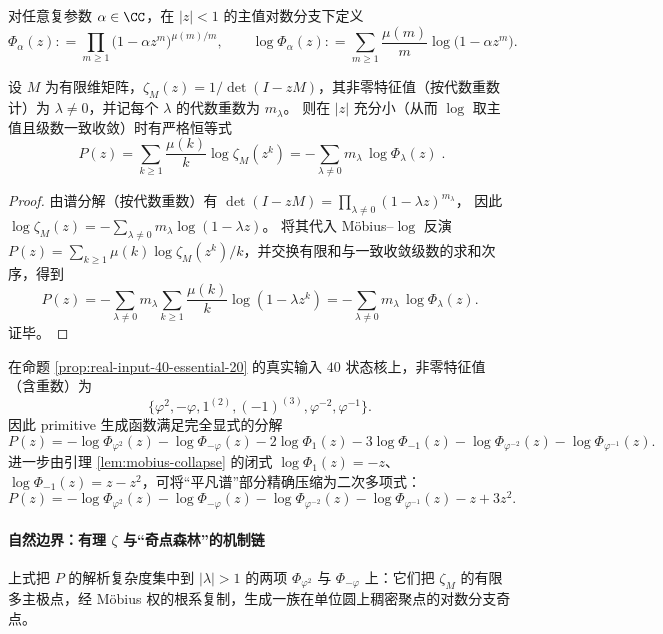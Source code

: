 \begin{definition}\label{def:mu-pochhammer}
对任意复参数 \(\alpha\in\CC\)，在 \(|z|<1\) 的主值对数分支下定义
\[
\Phi_\alpha(z)
:\!=\prod_{m\ge 1}\bigl(1-\alpha z^m\bigr)^{\mu(m)/m},
\qquad
\log\Phi_\alpha(z)
:\!=\sum_{m\ge 1}\frac{\mu(m)}{m}\log\bigl(1-\alpha z^m\bigr).
\]
\end{definition}

\begin{proposition}\label{prop:mu-pochhammer-decomposition}
设 \(M\) 为有限维矩阵，\(\zeta_M(z)=1/\det(I-zM)\)，其非零特征值（按代数重数计）为 \(\lambda\neq 0\)，并记每个 \(\lambda\) 的代数重数为 \(m_\lambda\)。
则在 \(|z|\) 充分小（从而 \(\log\) 取主值且级数一致收敛）时有严格恒等式
\[
\boxed{\;
P(z)
=\sum_{k\ge 1}\frac{\mu(k)}{k}\log\zeta_M(z^k)
=-\sum_{\lambda\neq 0}m_\lambda\,\log\Phi_\lambda(z)\; }.
\]
\end{proposition}
\begin{proof}
由谱分解（按代数重数）有
\(
\det(I-zM)=\prod_{\lambda\neq 0}(1-\lambda z)^{m_\lambda}
\)，
因此
\(
\log\zeta_M(z)
=-\sum_{\lambda\neq 0}m_\lambda\log(1-\lambda z)
\)。
将其代入 Möbius--$\log$ 反演
\(
P(z)=\sum_{k\ge 1}\mu(k)\log\zeta_M(z^k)/k
\)，并交换有限和与一致收敛级数的求和次序，得到
\[
P(z)
=-\sum_{\lambda\neq 0}m_\lambda\sum_{k\ge 1}\frac{\mu(k)}{k}\log(1-\lambda z^k)
=-\sum_{\lambda\neq 0}m_\lambda\,\log\Phi_\lambda(z).
\]
证毕。
\end{proof}

\begin{corollary}\label{cor:real-input-40-mu-pochhammer-explicit}
在命题 \ref{prop:real-input-40-essential-20} 的真实输入 \(40\) 状态核上，非零特征值（含重数）为
\[
\{\varphi^2,-\varphi,1^{(2)},(-1)^{(3)},\varphi^{-2},\varphi^{-1}\}.
\]
因此 primitive 生成函数满足完全显式的分解
\[
\boxed{
P(z)=
-\log\Phi_{\varphi^2}(z)
-\log\Phi_{-\varphi}(z)
-2\log\Phi_{1}(z)
-3\log\Phi_{-1}(z)
-\log\Phi_{\varphi^{-2}}(z)
-\log\Phi_{\varphi^{-1}}(z).
}
\]
进一步由引理 \ref{lem:mobius-collapse} 的闭式 \(\log\Phi_{1}(z)=-z\)、\(\log\Phi_{-1}(z)=z-z^2\)，可将“平凡谱”部分精确压缩为二次多项式：
\[
\boxed{
P(z)=
-\log\Phi_{\varphi^2}(z)
-\log\Phi_{-\varphi}(z)
-\log\Phi_{\varphi^{-2}}(z)
-\log\Phi_{\varphi^{-1}}(z)
-z+3z^2.
}
\]
\end{corollary}

\paragraph{自然边界：有理 \texorpdfstring{$\zeta$}{zeta} 与“奇点森林”的机制链}
上式把 \(P\) 的解析复杂度集中到 \(|\lambda|>1\) 的两项 \(\Phi_{\varphi^2}\) 与 \(\Phi_{-\varphi}\) 上：它们把 \(\zeta_M\) 的有限多主极点，经 Möbius 权的根系复制，生成一族在单位圆上稠密聚点的对数分支奇点。

